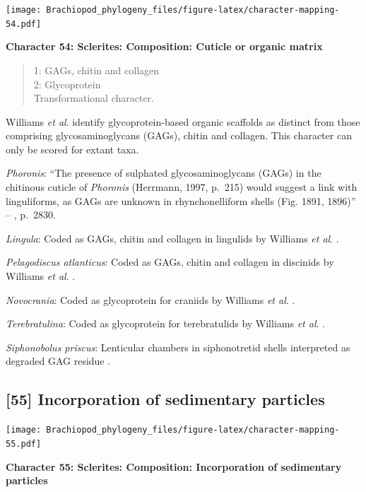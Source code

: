 \documentclass[]{book}
\theoremstyle{definition}
\theoremstyle{definition}
\theoremstyle{definition}
\theoremstyle{remark}
\begin{document}
\texttt{[image: Brachiopod\_phylogeny\_files/figure-latex/character-mapping-54.pdf]}

\textbf{Character 54: Sclerites: Composition: Cuticle or organic matrix}

\begin{quote}
1: GAGs, chitin and collagen\\
2: Glycoprotein\\
Transformational character.
\end{quote}

Williams \emph{et al}. \citeyearpar{Williams1996Asupra} identify
glycoprotein-based organic scaffolds as distinct from those comprising
glycosaminoglycans (GAGs), chitin and collagen. This character can only
be scored for extant taxa.

\emph{Phoronis}: ``The presence of sulphated glycosaminoglycans (GAGs)
in the chitinous cuticle of \emph{Phoronis} (Herrmann, 1997, p.~215)
would suggest a link with linguliforms, as GAGs are unknown in
rhynchonelliform shells (Fig. 1891, 1896)'' --
\citet{Williams2007PartH}, p.~2830.

\emph{Lingula}: Coded as GAGs, chitin and collagen in lingulids by
Williams \emph{et al}. \citeyearpar{Williams1996Asupra}.

\emph{Pelagodiscus atlanticus}: Coded as GAGs, chitin and collagen in
discinids by Williams \emph{et al}. \citeyearpar{Williams1996Asupra}.

\emph{Novocrania}: Coded as glycoprotein for craniids by Williams
\emph{et al}. \citeyearpar{Williams1996Asupra}.

\emph{Terebratulina}: Coded as glycoprotein for terebratulids by
Williams \emph{et al}. \citeyearpar{Williams1996Asupra}.

\emph{Siphonobolus priscus}: Lenticular chambers in siphonotretid shells
interpreted as degraded GAG residue
\citep{Williams2004Chemicostructure}.

\hypertarget{incorporation-of-sedimentary-particles}{%
\subsection*{{[}55{]} Incorporation of sedimentary
particles}\label{incorporation-of-sedimentary-particles}}

\texttt{[image: Brachiopod\_phylogeny\_files/figure-latex/character-mapping-55.pdf]}

\textbf{Character 55: Sclerites: Composition: Incorporation of
sedimentary particles}
\end{document}
